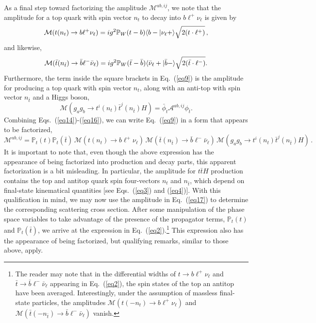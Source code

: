 \documentclass[aps,preprint,tightenlines,floatfix,superscriptaddress,nofootinbib,showpacs]{revtex4-1}
\def\beq{\begin{equation}}
\def\eeq{\end{equation}}
\def\tbar{\bar{t}}
\begin{document}
As a final step toward factorizing the amplitude $\mathcal{M}^{ab,ij}$,
we note that the amplitude for a top quark with spin vector
$n_t$ to decay into $b{\ell}^+\nu_{\ell}$ is given by
%
\beq
\label{eq14}
\mathcal{M}(t(n_t)\to b{\ell}^+\nu_{\ell})=ig^2\mathbb{P}_W(t-b)\langle b-|\nu_{\ell}+\rangle\sqrt{\strut2(t\cdot {\ell}^+)} \,,
\eeq
%
and likewise,
%
\beq
\label{eq15}
\mathcal{M}(\tbar(n_{\tbar})\to \bar{b}{\ell}^-\bar{\nu}_{\ell})=ig^2\mathbb{P}_W(\tbar-\bar{b})\langle \bar{\nu}_{\ell}+|\bar{b}-\rangle\sqrt{\strut2(\tbar\cdot {\ell}^-)}.
\eeq
%
Furthermore, the term inside the square brackets in
Eq.~(\ref{eq9}) is the amplitude for producing a top quark
with spin vector $n_t$, along with an anti-top with spin vector
$n_{\tbar}$ and a Higgs boson,
%
\beq
\label{eq16}
\mathcal{M}(g_ag_b \to t^i(n_t)\tbar^j(n_{\tbar})H)=\bar{\phi}_t \mathcal{A}^{ab,ij}\phi_{\tbar}.
\eeq
%
Combining Eqs.~(\ref{eq14})-(\ref{eq16}), we can write Eq.~(\ref{eq9})
in a form that appears to be factorized,
%
\beq
\label{eq17}
\mathcal{M}^{ab,ij}=\mathbb{P}_t(t)\mathbb{P}_t(\tbar)\,\mathcal{M}(t(n_t)\to b{\ell}^+\nu_{\ell})\,\mathcal{M}(\tbar(n_{\tbar})\to \bar{b}{\ell}^-\bar{\nu}_{\ell})\,\mathcal{M}(g_ag_b \to t^i(n_t)\tbar^j(n_{\tbar})H) \,.
\eeq
%
It is important
to note that, even though the above expression has the appearance of being
factorized into production and decay parts, this apparent
factorization is a bit misleading.  In particular, the amplitude for
$t\tbar H$ production contains the top and antitop quark
spin four-vectors $n_t$ and $n_{\tbar}$, which
depend on final-state kinematical quantities [see
Eqs.~(\ref{eq3}) and (\ref{eq4})].
With this qualification in mind, we may now use the
amplitude in Eq.~(\ref{eq17})
to determine the corresponding scattering cross section.
After some manipulation of the phase space variables
to take advantage of the presence of the
propagator terms, $\mathbb{P}_t(t)$ and $\mathbb{P}_t(\tbar)$,
we arrive at the expression in Eq.~(\ref{eq2}).\footnote{The reader may note that in the differential widths of $t\to b{\ell}^+\nu_{\ell}$ and $\tbar\to \bar{b}{\ell}^-\bar{\nu}_{\ell}$ appearing in 
Eq.~(\ref{eq2}), the spin states of the top an antitop have been averaged. Interestingly, under the assumption of massless final-state particles, the amplitudes $\mathcal{M}(t(-n_t)\to b{\ell}^+\nu_{\ell})$ and $\mathcal{M}(\tbar(-n_{\tbar})\to \bar{b}{\ell}^-\bar{\nu}_{\ell})$ vanish. } This expression
also has the appearance of being factorized, but
qualifying remarks, similar to those above, apply.

\setlength{\abovedisplayskip}{10.2pt}
\setlength{\belowdisplayskip}{10.2pt}
\end{document}
